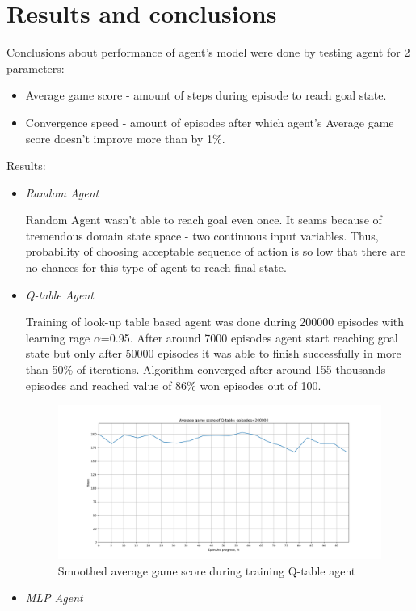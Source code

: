 \documentclass[12pt]{article}
\begin{document}
\section{Results and conclusions}{
Conclusions about performance of agent's model were done by testing agent for 2 parameters:
\begin{itemize}
\item Average game score - amount of steps during episode to reach goal state.
\item Convergence speed - amount of episodes after which agent's Average game score doesn't improve more than by 1\%.
\end{itemize}
Results:
\begin{itemize}
\item \textit{Random Agent}\par 
Random Agent wasn't able to reach goal even once. It seams because of tremendous domain state space - two continuous input variables. Thus, probability of choosing acceptable sequence of action is so low that there are no chances for this type of agent to reach final state. 
\item \textit{Q-table Agent}\par
Training of look-up table based agent was done during 200000 episodes with learning rage $\alpha$=0.95. After around 7000 episodes agent start reaching goal state but only after 50000 episodes it was able to finish successfully in more than 50\% of iterations. Algorithm converged after around 155 thousands episodes and reached value of 86\% won episodes out of 100.
\begin{figure}[h!]
\begin{center}
\includegraphics[scale=0.4]{images/q_table_result.png}
\caption{Smoothed average game score during training Q-table agent}
\end{center}
\end{figure}
\item \textit{MLP Agent}\par 

\end{itemize}}
\end{document}
